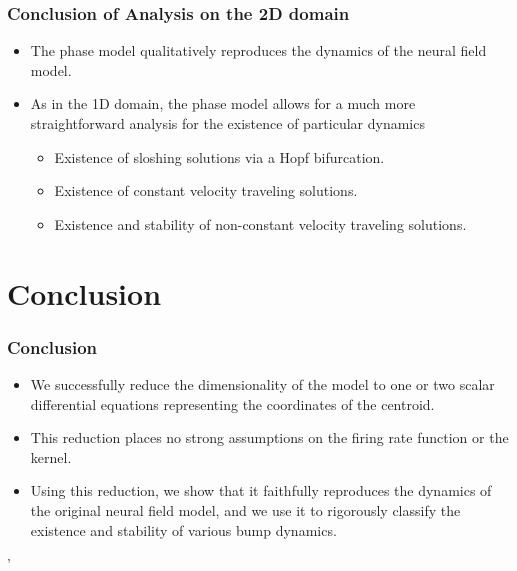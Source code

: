 \documentclass{beamer}
\begin{document}
\begin{frame}
 \frametitle{Conclusion of Analysis on the 2D domain}
 \begin{itemize}
  \item The phase model qualitatively reproduces the dynamics of the neural field model.
  \item As in the 1D domain, the phase model allows for a much more straightforward analysis for the existence of particular dynamics
  \begin{itemize}
  \item Existence of sloshing solutions via a Hopf bifurcation.
  \item Existence of constant velocity traveling solutions.
  \item Existence and stability of non-constant velocity traveling solutions.
 \end{itemize}
\end{itemize}
\end{frame}


\section{Conclusion}
\begin{frame}
 \frametitle{Conclusion}
 \vspace{-.1in}
 \begin{itemize}
  \item We successfully reduce the dimensionality of the model to one or two scalar differential equations representing the coordinates of the centroid.
  \item This reduction places no strong assumptions on the firing rate function or the kernel.
  \item Using this reduction, we show that it faithfully reproduces the dynamics of the original neural field model, and we use it to rigorously classify the existence and stability of various bump dynamics.
 \end{itemize}'


\end{frame}
\end{document}
